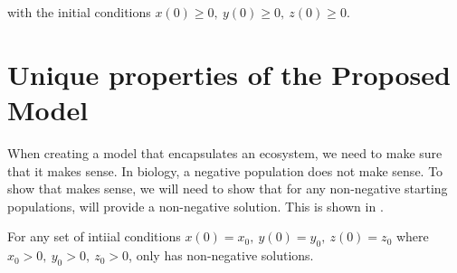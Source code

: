 with the initial conditions $x(0) \geq 0,\ y(0) \geq 0,\ z(0) \geq 0$.

\section{Unique properties of the Proposed Model}
When creating a model that encapsulates an ecosystem, we need to make sure that it makes sense. In biology, a negative population does not make sense. To show that  makes sense, we will need to show that for any non-negative starting populations,  will provide a non-negative solution. This is shown in .

\begin{theorem}\label{thm:positiveness}
    For any set of intiial conditions $x(0) = x_0,\ y(0) = y_0,\ z(0) = z_0$ where $x_0 > 0,\ y_0 > 0,\ z_0 > 0$,  only has non-negative solutions.
\end{theorem}
